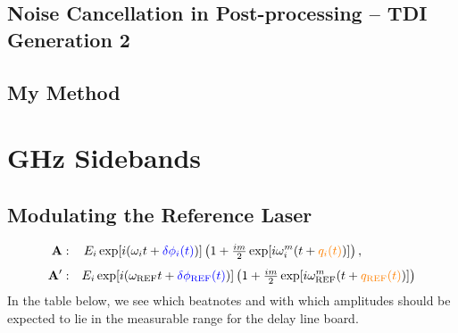 \documentclass[11pt]{article}
\begin{document}
\subsection*{Noise Cancellation in Post-processing -- TDI Generation 2}

\subsection*{My Method}

\section*{GHz Sidebands}
\subsection*{Modulating the Reference Laser}
\begin{align*}
\mathbf{A}:&\quad\,E_{i}\exp[i(\omega_{i} t + {\color{blue}\delta\phi_{i}(t)})]
  \left(1 + \tfrac{im}{2}\exp[i\omega_{i}^m (t + {\color{orange}q_{i}(t)})]\right),
  \label{eq:fieldA}\\[4pt]
\mathbf{A'}:&\quad
 E_{i}\exp[i(\omega_{\text{REF}}t + {\color{blue}\delta\phi_{\text{REF}
 }(t)})] \left(1 + \tfrac{im}{2}\exp[i\omega_{\text{REF}}^m (t + {\color{orange}q_{\text{REF}}(t)})]\right)
\end{align*}
In the table below, we see which beatnotes and with which amplitudes should be expected to lie in the measurable range for the delay line board.
 
\end{document}

